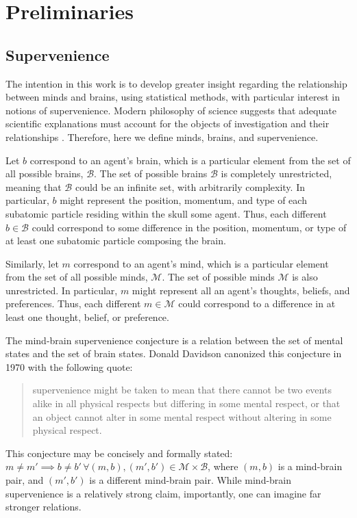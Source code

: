 \documentclass{article}
\newcommand{\mB}{\mathcal{B}}
\newcommand{\mM}{\mathcal{M}}
\providecommand{\mc}[1]{\mathcal{#1}}
\begin{document}
\section{Preliminaries} %
\label{sec:preliminaries}

\subsection{Supervenience} %
\label{sub:supervenience}

The intention in this work is to develop greater insight regarding the relationship between minds and brains, using statistical methods, with particular interest in notions of supervenience.  Modern philosophy of science suggests that adequate scientific explanations must account for the objects of investigation and their relationships \cite{Craver07}. Therefore, here we define minds, brains, and supervenience.


Let $b$ correspond to an agent's brain, which is a particular element from the set of all possible brains, $\mB$.  The set of possible brains $\mB$ is completely unrestricted, meaning that $\mB$ could be an infinite set, with arbitrarily complexity.  In particular, $b$ might represent the position, momentum, and type of each subatomic particle residing within the skull some agent.  Thus, each different $b \in \mB$ could correspond to some difference in the position, momentum, or type of at least one subatomic particle composing the brain.

Similarly, let $m$ correspond to an agent's mind, which is a particular element from the set of all possible minds, $\mM$.  The set of possible minds $\mM$ is also unrestricted. In particular, $m$ might represent all an agent's thoughts, beliefs, and preferences. Thus, each different $m \in \mM$ could correspond to a difference in at least one thought, belief, or preference. 


The mind-brain supervenience conjecture is a relation between the set of mental states and the set of brain states.  Donald Davidson canonized this conjecture in 1970 with the following quote: \cite{Davidson70}
\begin{quotation}
\noindent supervenience might be taken to mean that there cannot be two events alike in all physical respects but differing in some mental respect, or that an object cannot alter in some mental respect without altering in some physical respect.
\end{quotation}
This conjecture may be concisely and formally stated: $m \neq m' \implies b \neq b' \, \forall (m,b), (m',b') \in \mc{M} \times \mc{B}$, where $(m,b)$ is a mind-brain pair, and $(m',b')$ is a different mind-brain pair.  While mind-brain supervenience is a relatively strong claim, importantly, one can imagine far stronger relations.
\end{document}
